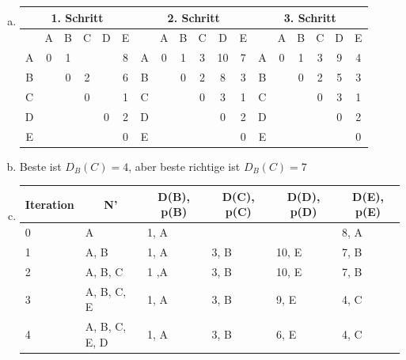 

\usepackage{multicol,tabularx}
\usepackage{graphicx}
\usepackage{float}
\renewcommand{\arraystretch}{1.5}

\date{Mittwoch 27.11.2019}


\renewcommand{\L}{\text{L}}
\newcommand{\R}{\text{R}}
\newcommand\Ssend{\text{S}_{\text{send}}}
\newcommand{\bits}{\text{ b}}

\newcommand\lal[1]{\multicolumn{1}{c|}{#1}}
\newcommand\lale[1]{\multicolumn{1}{c}{#1}}

\renewcommand{\iff}{\Leftrightarrow}


\maketitle
\thispagestyle{fancy}


\begin{enumerate}[a)]
	\item \begin{tabular}{c|c|c|c|c|c||c|c|c|c|c|c||c|c|c|c|c|c}
	 \multicolumn{6}{c||}{1. Schritt} & \multicolumn{6}{c||}{2. Schritt} & \multicolumn{6}{c}{3. Schritt}  \\ \hline
	  &A&B&C&D&E&   &A&B&C&D&E&   &A&B&C&D&E  \\ \hline
	A &0&1&\infty &\infty &8& A &0&1&3&10&7& A &0&1&3&9&4 \\ \hline
	B & &0&2&\infty &6& B & &0&2&8&3& B & &0&2&5&3  \\ \hline
	C & & &0&\infty &1 & C & & &0&3&1& C & & &0&3&1 \\ \hline
	D & & & &0&2& D & & & &0&2& D & & & &0&2   \\ \hline
	E & & & & &0& E & & & & &0& E & & & & &0  \\ 
	
	\end{tabular}
	
	
	\item Beste ist $D_B(C)=4$, aber beste richtige ist $D_B(C)=7$
	
	\item 
	
	\begin{tabular}{l|l|l|l|l|l}
	\lal{Iteration} & \lal{N'}&\lal{D(B), p(B)}  & \lal{D(C), p(C)}  & \lal{D(D), p(D)}  & \lale{D(E), p(E)}  \\ \hline
	0         &A        &1, A          &\infty       &\infty       &8, A          \\
	1         &A, B      &1, A          & 3, B         &10, E         &7, B          \\
	2         &A, B, C    & 1 ,A         & 3, B         &10, E         &7, B          \\
	3         &A, B, C, E  & 1, A         & 3, B         &9, E          &4, C          \\
	4         &A, B, C, E, D& 1, A         & 3, B         &6, E          &4, C          \\
	
	
	\end{tabular}
\end{enumerate}

